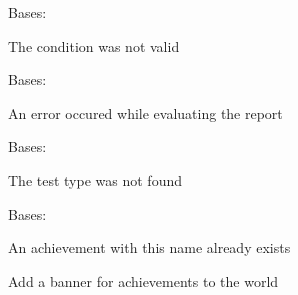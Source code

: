 \documentclass[letterpaper,10pt,english]{sphinxmanual}
\begin{document}

\begin{fulllineitems}
\label{blocks:serge.blocks.achievements.BadCondition}
Bases: 

The condition was not valid

\end{fulllineitems}


\begin{fulllineitems}
\label{blocks:serge.blocks.achievements.BadReport}
Bases: 

An error occured while evaluating the report

\end{fulllineitems}


\begin{fulllineitems}
\label{blocks:serge.blocks.achievements.BadTestType}
Bases: 

The test type was not found

\end{fulllineitems}


\begin{fulllineitems}
\label{blocks:serge.blocks.achievements.DuplicateAchievement}
Bases: 

An achievement with this name already exists

\end{fulllineitems}


\begin{fulllineitems}
\label{blocks:serge.blocks.achievements.addAchievementsBannerToWorld}
Add a banner for achievements to the world

\end{fulllineitems}
\end{document}
